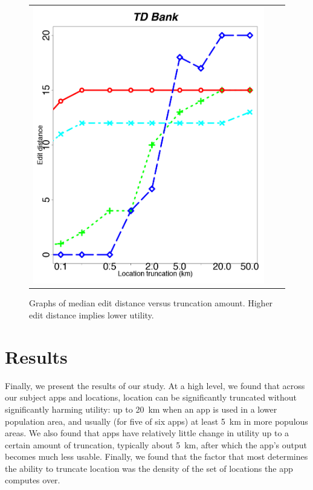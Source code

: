 \documentclass[10pt, conference, compsocconf]{IEEEtran}
\begin{document}
\begin{figure}[t!]
\begin{tabular}{ccc}
    \begin{minipage}{2in}
      \includegraphics[width=\textwidth]
                      {data/tdbank/plots/medians_across_city_20}
    \end{minipage}
  \end{tabular}
  \caption{Graphs of median edit distance versus truncation
    amount. Higher edit distance implies lower utility.}
  \label{fig:edit-distance-metric}
\end{figure}

\section{Results}
\label{sec:results}

Finally, we present the results of our study. At a high level, we
found that across our
subject apps and locations, location can be
significantly truncated without significantly harming utility: up to 20~km
when an app is used in a lower population area, and usually (for five of six apps) 
at least 5~km in more populous areas.  We also found that apps have relatively little 
change in utility up to a certain amount of truncation, typically
about 5~km, after 
which the app's output becomes much less usable.  Finally, we found that the factor 
that most determines the ability to truncate location was the density
of the set of locations the app computes over.
\end{document}

